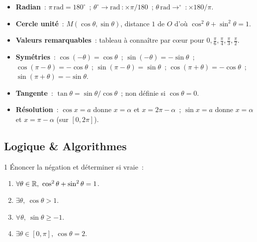 \begin{bilan}
\begin{itemize}
  \item \textbf{Radian}~: $\pi\,\text{rad}=180^{\circ}$~;
        $\theta^{\circ}\to\text{rad}~: \times\pi/180$~;
        $\theta\,\text{rad}\to^{\circ}~: \times180/\pi$.
  \item \textbf{Cercle unit\'e}~: $M(\cos\theta,\sin\theta)$,
        distance $1$ de $O$ d'o\`u $\cos^2\theta+\sin^2\theta=1$.
  \item \textbf{Valeurs remarquables}~: tableau \`a conna\^itre par c\oe ur
        pour $0, \frac{\pi}{6}, \frac{\pi}{4}, \frac{\pi}{3}, \frac{\pi}{2}$.
  \item \textbf{Sym\'etries}~:
        $\cos(-\theta)=\cos\theta$~; $\sin(-\theta)=-\sin\theta$~;
        $\cos(\pi-\theta)=-\cos\theta$~; $\sin(\pi-\theta)=\sin\theta$~;
        $\cos(\pi+\theta)=-\cos\theta$~; $\sin(\pi+\theta)=-\sin\theta$.
  \item \textbf{Tangente}~: $\tan\theta=\sin\theta/\cos\theta$~;
        non d\'efinie si $\cos\theta=0$.
  \item \textbf{R\'esolution}~: $\cos x=a$ donne $x=\alpha$ et $x=2\pi-\alpha$~;
        $\sin x=a$ donne $x=\alpha$ et $x=\pi-\alpha$ (sur $[0,2\pi]$).
\end{itemize}

\subsection*{Logique \& Algorithmes}

\begin{exo}{1}
\'Enoncer la n\'egation et d\'eterminer si vraie~:
\begin{enumerate}
  \item $\forall\theta\in\R,\ \cos^2\theta+\sin^2\theta=1$.
  \item $\exists\theta,\ \cos\theta>1$.
  \item $\forall\theta,\ \sin\theta\geq-1$.
  \item $\exists\theta\in[0,\pi],\ \cos\theta=2$.
\end{enumerate}
\end{exo}


\end{bilan}
